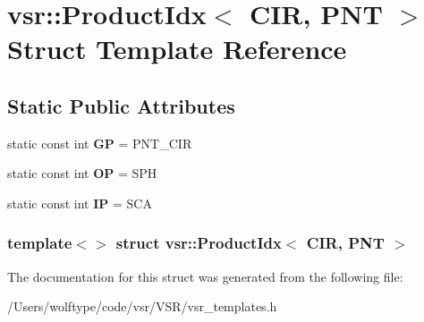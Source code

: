 \hypertarget{structvsr_1_1_product_idx_3_01_c_i_r_00_01_p_n_t_01_4}{\section{vsr\-:\-:Product\-Idx$<$ C\-I\-R, P\-N\-T $>$ Struct Template Reference}
\label{structvsr_1_1_product_idx_3_01_c_i_r_00_01_p_n_t_01_4}
}
\subsection*{Static Public Attributes}
\begin{DoxyCompactItemize}
\item 
\hypertarget{structvsr_1_1_product_idx_3_01_c_i_r_00_01_p_n_t_01_4_a72e23ab5dc3781e3bdb75e193173acd4}{static const int {\bfseries G\-P} = P\-N\-T\-\_\-\-C\-I\-R}\label{structvsr_1_1_product_idx_3_01_c_i_r_00_01_p_n_t_01_4_a72e23ab5dc3781e3bdb75e193173acd4}

\item 
\hypertarget{structvsr_1_1_product_idx_3_01_c_i_r_00_01_p_n_t_01_4_a66b2ec526888e80fd4feb9bad8cbb72d}{static const int {\bfseries O\-P} = S\-P\-H}\label{structvsr_1_1_product_idx_3_01_c_i_r_00_01_p_n_t_01_4_a66b2ec526888e80fd4feb9bad8cbb72d}

\item 
\hypertarget{structvsr_1_1_product_idx_3_01_c_i_r_00_01_p_n_t_01_4_a6c9929116775a564e7e8ba959d109b8d}{static const int {\bfseries I\-P} = S\-C\-A}\label{structvsr_1_1_product_idx_3_01_c_i_r_00_01_p_n_t_01_4_a6c9929116775a564e7e8ba959d109b8d}

\end{DoxyCompactItemize}
\subsubsection*{template$<$$>$ struct vsr\-::\-Product\-Idx$<$ C\-I\-R, P\-N\-T $>$}



The documentation for this struct was generated from the following file\-:\begin{DoxyCompactItemize}
\item 
/\-Users/wolftype/code/vsr/\-V\-S\-R/vsr\-\_\-templates.\-h\end{DoxyCompactItemize}
